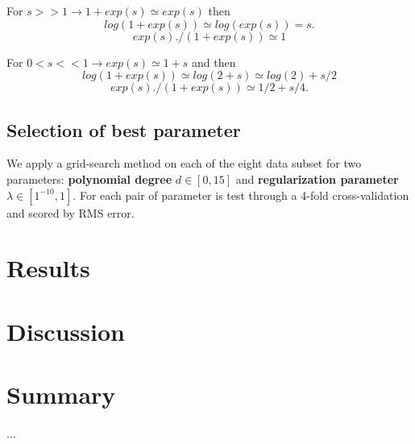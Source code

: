 \documentclass[10pt,conference,compsocconf]{IEEEtran}
\begin{document}
For $s >> 1 \rightarrow 1+exp(s) \simeq exp(s)$ then 
$$
log(1+exp(s)) \simeq log(exp(s))=s.
$$
$$
exp(s)./(1+exp(s))\simeq 1
$$

For $0 < s << 1 \rightarrow exp(s)\simeq 1+s$ and then
$$
log(1+exp(s))\simeq log(2+s) \simeq log(2)+s/2
$$
$$
exp(s)./(1+exp(s)) \simeq 1/2+s/4.
$$

\subsection{Selection of best parameter}
We apply a grid-search method on each of the eight data subset for two parameters: \textbf{polynomial degree} $d \in [0, 15]$ and \textbf{regularization parameter} $\lambda \in [1^{-10}, 1]$.  For each pair of parameter is test through a 4-fold cross-validation and scored by RMS error.

\section{Results}



\section{Discussion}


\section{Summary}

...




\end{document}
